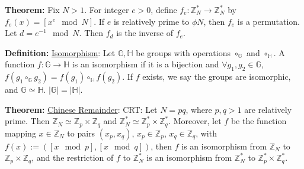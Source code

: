 \documentclass[10pt]{article}
\newcommand{\Z}{\mathbb{Z}}
\newcommand{\G}{\mathbb{G}}
\newcommand{\HH}{\mathbb{H}}
\newcommand{\defn}[1]{{\bf Definition:} \underline{#1}}
\newcommand{\thm}[1]{{\bf Theorem:} \underline{#1}}
\begin{document}
\begin{multicols}{5}
\thm{}Fix $N>1$. For integer $e>0$, define $f_e:\Z_N^*\to\Z_N^*$ by $f_e(x)=[x^e\mod{N}]$. If $e$ is relatively prime to $\phi{N}$, then $f_e$ is a permutation. Let $d=e^{-1}\mod{N}$. Then $f_d$ is the inverse of $f_e$.

\defn{Isomorphism}: Let $\G,\HH$ be groups with operations $\circ_\G$ and $\circ_\HH$. A function $f:\G\to\HH$ is an isomorphism if it is a bijection and $\forall g_1,g_2\in\G$, $f(g_1\circ_\G g_2)=f(g_1)\circ_\HH f(g_2)$. If $f$ exists, we say the groups are isomorphic, and $\G\simeq\HH$. $|\G|=|\HH|$.

\thm{Chinese Remainder}: CRT: Let $N=pq$, where $p,q>1$ are relatively prime. Then $\Z_N\simeq\Z_p\times\Z_q$ and $\Z_N^*\simeq\Z_p^*\times\Z_q^*$. Moreover, let $f$ be the function mapping $x\in\Z_N$ to pairs $(x_p,x_q)$, $x_p\in\Z_p$, $x_q\in\Z_q$, with $f(x):=([x\mod{p}],[x\mod{q}])$, then $f$ is an isomorphism from $\Z_N$ to $\Z_p\times\Z_q$, and the restriction of $f$ to $\Z_N^*$ is an isomorphism from $\Z_N^*$ to $\Z_p^*\times\Z_q^*$.

\end{multicols}
\end{document}
